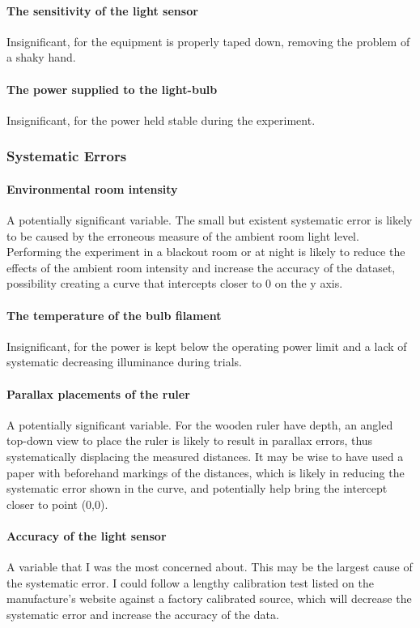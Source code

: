 \documentclass[a4paper,12pt]{article}
\begin{document}
\paragraph{The sensitivity of the light sensor} Insignificant, for the equipment is properly taped down, removing the problem of a shaky hand.

\paragraph{The power supplied to the light-bulb}
Insignificant, for the power held stable during the experiment.

\subsubsection{Systematic Errors}
\paragraph{Environmental room intensity}
A potentially significant variable. The small but existent systematic error is likely to be caused by the erroneous measure of the ambient room light level. Performing the experiment in a blackout room or at night is likely to reduce the effects of the ambient room intensity and increase the accuracy of the dataset, possibility creating a curve that intercepts closer to 0 on the y axis.

\paragraph{The temperature of the bulb filament}
Insignificant, for the power is kept below the operating power limit and a lack of systematic decreasing illuminance during trials.

\paragraph{Parallax placements of the ruler}
A potentially significant variable. For the wooden ruler have depth, an angled top-down view to place the ruler is likely to result in parallax errors, thus systematically displacing the measured distances. It may be wise to have used a paper with beforehand markings of the distances, which is likely in reducing the systematic error shown in the curve, and potentially help bring the intercept closer to point (0,0).

\paragraph{Accuracy of the light sensor}
A variable that I was the most concerned about. This may be the largest cause of the systematic error. I could follow a lengthy calibration test listed on the manufacture's website against a factory calibrated source, which will decrease the systematic error and increase the accuracy of the data.

\nocite{*}
\printbibliography
\end{document}
